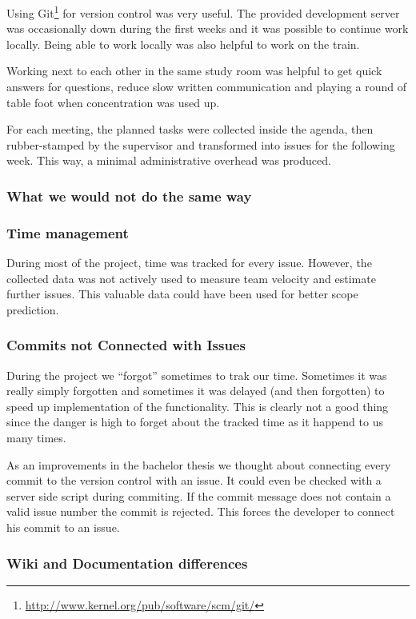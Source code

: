 Using Git\footnote{\url{http://www.kernel.org/pub/software/scm/git/}} for
version 
control was very useful. The provided development server was occasionally down 
during the first weeks and it was possible to continue work locally. Being able 
to work locally was also helpful to work on the train. 

Working next to each other in the same study room was helpful to get quick 
answers for questions, reduce slow written communication and playing a round of 
table foot when concentration was used up.

For each meeting, the planned tasks were collected inside the agenda, then 
rubber-stamped by the supervisor and transformed into issues for the following 
week. This way, a minimal administrative overhead was produced.

\subsubsection{What we would not do the same way}

\subsubsection*{Time management}
During most of the project, time was tracked for every issue. 
However, the collected data was not actively used to measure team velocity and 
estimate further issues. This valuable data could have been used for better 
scope prediction.

\subsubsection*{Commits not Connected with Issues}

During the project we ``forgot'' sometimes to trak our time. Sometimes it was
really simply forgotten and sometimes it was delayed (and then forgotten) to
speed up implementation of the functionality. This is clearly not a good thing
since the danger is high to forget about the tracked time as it happend to us
many times.

As an improvements in the bachelor thesis we thought about connecting every
commit to the version control with an issue. It could even be checked with a
server side script during commiting. If the commit message does not contain a
valid issue number the commit is rejected. This forces the developer to connect
his commit to an issue.

\subsubsection*{Wiki and Documentation differences}

